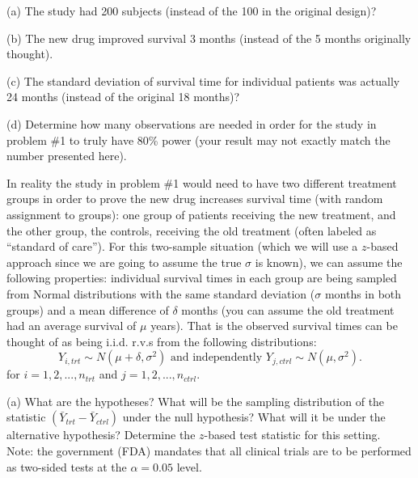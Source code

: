 \documentclass[11pt]{article}
\begin{document}
\noindent (a) The study had 200 subjects (instead of the 100 in the original design)?

\vspace{0.1in}

\noindent (b) The new drug improved survival 3 months (instead of the 5 months originally thought).

\vspace{0.1in}

\noindent(c) The standard deviation of survival time for individual patients was actually 24 months (instead of the original 18 months)?

\vspace{0.1in}

\noindent (d) Determine how many observations are needed in order for the study in problem \#1 to truly have 80\% power (your result may not exactly match the number presented here).

\vspace{0.3in}


 In reality the study in problem \#1 would need to have two different treatment groups in order to prove the new drug increases survival time (with random assignment to groups): one group of patients receiving the new treatment, and the other group, the controls, receiving the old treatment (often labeled as ``standard of care'').   For this two-sample situation (which we will use a $z$-based approach since we are going to assume the true $\sigma$ is known), we can assume the following properties: individual survival times in each group are being sampled from Normal distributions with the same standard deviation ($\sigma$ months in both groups) and a mean difference of $\delta$ months (you can assume the old treatment had an average survival of $\mu$ years).  That is the observed survival times can be thought of as being i.i.d. r.v.s from the following distributions:
$$Y_{i,trt} \sim N(\mu+\delta,\sigma^2) \text{ and independently }Y_{j,ctrl} \sim N(\mu,\sigma^2).$$
for $i = 1,2,...,n_{trt}$ and $j= 1,2,...,n_{ctrl}$.

\vspace{0.1in}

\noindent (a) What are the hypotheses?  What will be the sampling distribution of the statistic $(\bar{Y}_{trt} - \bar{Y}_{ctrl})$  under the null hypothesis?  What will it be under the alternative hypothesis?  Determine the $z$-based test statistic for this setting.\\
Note: the government (FDA) mandates that all clinical trials are to be performed as two-sided tests at the $\alpha = 0.05$  level.
\end{document}
